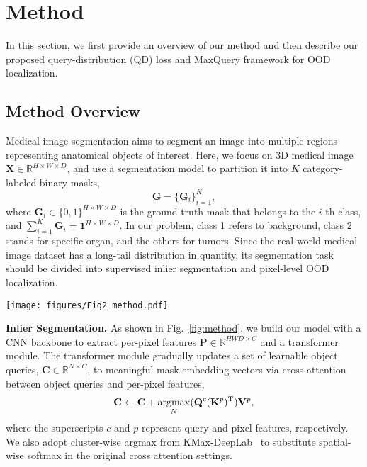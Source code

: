 \documentclass[10pt,twocolumn,letterpaper]{article}
\begin{document}
\section{Method}
\label{sec:method}
In this section, we first provide an overview of our method and then describe our proposed query-distribution (QD) loss and MaxQuery framework for OOD localization. 
\subsection{Method Overview}
Medical image segmentation aims to segment an image into multiple regions representing anatomical objects of interest. Here, we focus on 3D medical image $\mathbf{X} \in \mathbb{R}^{H \times W \times D}$, and use a segmentation model to partition it into $K$ category-labeled binary masks,
\begin{equation}
\label{eq:ground-truth}
    \mathbf{G} = \{\mathbf{G}_{i}\}_{i=1}^{K},
\end{equation}
where $\mathbf{G}_{i} \in \{0, 1\}^{H \times W \times D}$ is the ground truth mask that belongs to the $i$-th class, and $\sum_{i=1}^{K} \mathbf{G}_{i} = \mathbf{1}^{H \times W \times D}$. In our problem, class 1 refers to background, class 2 stands for specific organ, and the others for tumors. Since the real-world medical image dataset has a long-tail distribution in quantity, its segmentation task should be divided into supervised inlier segmentation and pixel-level OOD localization.
\begin{figure*}[t]
  \centering
  \texttt{[image: figures/Fig2\_method.pdf]}
  \caption{Overview of our proposed framework. (a) A CNN backbone for image segmentation, here we use nnUNet~\cite{isensee2021nnu}; (b) A transformer decoder interatively updates the object queries to fit the inlier cluster centers; (c) A two-stage cluster analysis: 1) cluster assignment groups the pixels based on the affinity between pixel features and cluster centers; 2) cluster classification guides the grouped pixels to generate segmentation logits. The overall segmentation is supervised by a classic segmentation loss and a novel query-distribution loss.}
  \label{fig:method}
  \vspace{-3mm}
\end{figure*}

{\bf Inlier Segmentation.} As shown in Fig.~\ref{fig:method}, we build our model with a CNN backbone to extract per-pixel features $\mathbf{P} \in \mathbb{R}^{HWD \times C}$ and a transformer module. The transformer module gradually updates a set of learnable object queries, $\mathbf{C} \in \mathbb{R}^{N \times C}$, to meaningful mask embedding vectors via cross attention between object queries and per-pixel features, 
\begin{equation}
    \mathbf{C} \gets \mathbf{C} +  \operatornamewithlimits{argmax}_{N} (\mathbf{Q}^c (\mathbf{K}^{p})^{\mathrm{T}}) \mathbf{V}^{p},
\end{equation}
where the superscripts $c$ and $p$ represent query and pixel features, respectively. We also adopt cluster-wise argmax from KMax-DeepLab~\cite{yu2022k} to substitute spatial-wise softmax in the original cross attention settings.
\end{document}
